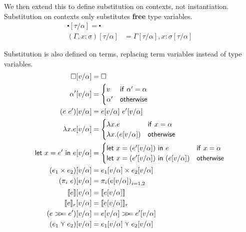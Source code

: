 We then extend this to define substitution on contexts, not
instantiation. Substitution on contexts only substitutes \textbf{free}
type variables.
\begin{align*}
  \centerdot[\tau/\alpha] = \centerdot \\
  (\Gamma , x : \sigma) [\tau/\alpha] &= \Gamma[\tau/\alpha] , x : \sigma[\tau/\alpha]
\end{align*}

Substitution is also defined on terms, replacing term variables
instead of type variables.
\begin{align*}
  \square [v/\alpha] &= \square \\
  \alpha' [v/\alpha] &=
             \begin{cases}
               v & \mathsf{if} \ \alpha' = \alpha \\
               \alpha' & \mathsf{otherwise}
             \end{cases} \\
  (e \ e') [v/\alpha] &= e[v/\alpha] \ e'[v/\alpha] \\
  \lambda x . e [v/\alpha] &=
                  \begin{cases}
                    \lambda x . e & \mathsf{if} \ x = \alpha \\
                    \lambda x . (e [v/\alpha]) & \mathsf{otherwise}
                  \end{cases} \\
  \letin{x = e'}{e} [v/\alpha] &=
                               \begin{cases}
                                 \letin{x = (e' [v/\alpha])}{e} & \mathsf{if} \
                                 x = \alpha \\
                                 \letin{x = (e' [v/\alpha])}{(e [v/\alpha])}
                                 & \mathsf{otherwise}
                               \end{cases} \\  
  (e_1 \times e_2) [v/\alpha] &= e_1[v/\alpha] \times e_2[v/\alpha] \\
  (\pi_i \ e) [v/\alpha] &= {\pi_i (e [v/\alpha])}_{i = 1, 2} \\
  \lift{e} [v/\alpha] &= \lift{e[v/\alpha]} \\
  \use{r}{e} [v/\alpha] &= \use{r}{e[v/\alpha]} \\
  (e \bind e') [v/\alpha] &= e[v/\alpha] \bind e'[v/\alpha] \\
  (e_1 \curlyvee e_2) [v/\alpha] &= e_1[v/\alpha] \curlyvee e_2 [v/\alpha]
\end{align*}

